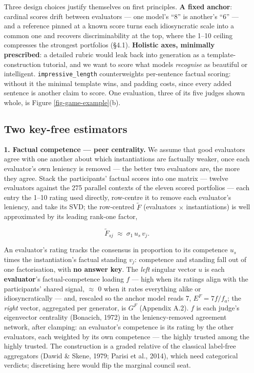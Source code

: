 \documentclass{article}
\begin{document}
Three design choices justify themselves on first principles. \textbf{A fixed anchor}: cardinal scores drift between evaluators --- one model's ``8'' is another's ``6'' --- and a reference pinned at a known score turns each idiosyncratic scale into a common one and recovers discriminability at the top, where the 1--10 ceiling compresses the strongest portfolios (\S{}4.1). \textbf{Holistic axes, minimally prescribed}: a detailed rubric would leak back into generation as a template-construction tutorial, and we want to score what models \emph{recognise} as beautiful or intelligent. \texttt{impressive\_\allowbreak{}length} counterweights per-sentence factual scoring: without it the minimal template wins, and padding costs, since every added sentence is another claim to score. One evaluation, three of its five judges shown whole, is Figure \ref{fig-game-example}(b).

\subsection{Two key-free estimators}\label{two-key-free-estimators}

\textbf{1. Factual competence --- peer centrality.} We assume that good evaluators agree with one another about which instantiations are factually weaker, once each evaluator's own leniency is removed --- the better two evaluators are, the more they agree. Stack the participants' factual scores into one matrix --- twelve evaluators against the 275 parallel contexts of the eleven scored portfolios --- each entry the 1--10 rating used directly, row-centre it to remove each evaluator's leniency, and take its SVD; the row-centred \(\tilde F\) (evaluators \ensuremath{\times} instantiations) is well approximated by its leading rank-one factor,

\[\tilde F_{sj} \;\approx\; \sigma_1\, u_s\, v_j . \tag{1}\]

An evaluator's rating tracks the consensus in proportion to its competence \(u_s\) times the instantiation's factual standing \(v_j\): competence and standing fall out of one factorisation, with \textbf{no answer key}. The \emph{left} singular vector \(u\) is each \textbf{evaluator}'s factual-competence loading \(f\) --- high when its ratings align with the participants' shared signal, \ensuremath{\approx} 0 when it rates everything alike or idiosyncratically --- and, rescaled so the anchor model reads 7, \(E^{F} = 7f/f_a\); the \emph{right} vector, aggregated per generator, is \(G^{F}\) (Appendix A.2). \(f\) is each judge's eigenvector centrality (Bonacich, 1972) in the leniency-removed agreement network, after clamping: an evaluator's competence is its rating by the other evaluators, each weighted by its own competence --- the highly trusted among the highly trusted. The construction is a graded relative of the classical label-free aggregators (Dawid \& Skene, 1979; Parisi et al., 2014), which need categorical verdicts; discretising here would flip the marginal council seat.
\end{document}
